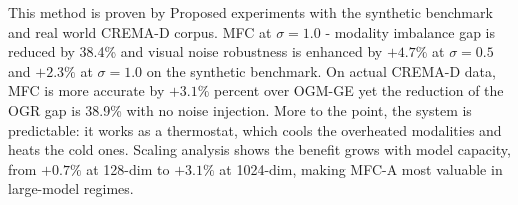 \documentclass[preprint,a4paper, 10pt, 5p]{elsarticle}
\begin{document}
This method is proven by Proposed experiments with the synthetic benchmark and real world CREMA-D corpus. MFC at $\sigma{=}1.0$ - modality imbalance gap is reduced by 38.4\% and visual noise robustness is enhanced by $+4.7\%$ at $\sigma{=}0.5$ and $+2.3\%$ at $\sigma{=}1.0$ on the synthetic benchmark. On actual CREMA-D data, MFC is more accurate by $+3.1\%$ percent over OGM-GE yet the reduction of the OGR gap is 38.9\% with no noise injection. More to the point, the system is predictable: it works as a thermostat, which cools the overheated modalities and heats the cold ones. Scaling analysis shows the benefit grows with model capacity, from $+0.7\%$ at 128-dim to $+3.1\%$ at 1024-dim, making MFC-A most valuable in large-model regimes.


\end{document}
